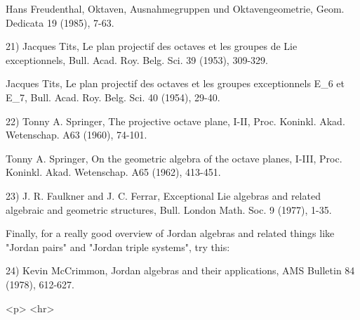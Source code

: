 Hans Freudenthal, Oktaven, Ausnahmegruppen und Oktavengeometrie,
Geom. Dedicata 19 (1985), 7-63.   

21) Jacques Tits, Le plan projectif des octaves et les groupes de Lie
exceptionnels, Bull. Acad. Roy. Belg. Sci. 39 (1953), 309-329.

Jacques Tits, Le plan projectif des octaves et les groupes exceptionnels
E_{6} et E_{7}, Bull. Acad. Roy. Belg. Sci. 40 (1954), 29-40.

22) Tonny A. Springer, The projective octave plane, I-II, Proc. Koninkl.
Akad. Wetenschap. A63 (1960), 74-101.
 
Tonny A. Springer, On the geometric algebra of the octave planes, I-III,
Proc. Koninkl. Akad. Wetenschap. A65 (1962), 413-451.

23) J. R. Faulkner and J. C. Ferrar, Exceptional Lie algebras and related
algebraic and geometric structures, Bull. London Math. Soc. 9 (1977),
1-35.  

Finally, for a really good overview of Jordan algebras and related
things like "Jordan pairs" and "Jordan triple
systems", try this:

24) Kevin McCrimmon, Jordan algebras and their applications, AMS Bulletin
84 (1978), 612-627.









<p> <hr>



